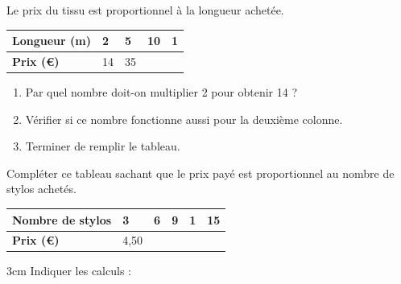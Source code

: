\documentclass[a4paper]{book}
\begin{document}
    \begin{exercice}
        Le prix du tissu est proportionnel à la longueur achetée.

        \begin{center}
            \renewcommand{\arraystretch}{1.8}
            \begin{tabularx}{0.8\textwidth}{|l|X|X|X|X|}
            \hline
            \textbf{Longueur (m)} & 2 & 5 & 10 & 1 \\ \hline
            \textbf{Prix (€)} & 14 & 35 & & \\ \hline
            \end{tabularx}
        \end{center}
        
        \begin{enumerate}
            \item Par quel nombre doit-on multiplier 2 pour obtenir 14 ? \dotfill

            \smallskip
            
            \item Vérifier si ce nombre fonctionne aussi pour la deuxième colonne. \dotfill

            \smallskip
            
            \item Terminer de remplir le tableau. 
        \end{enumerate}
    \end{exercice}


    \begin{exercice}
        Compléter ce tableau sachant que le prix payé est proportionnel au nombre de stylos achetés.

        \vspace{1cm}
        
        \begin{center}
            \renewcommand{\arraystretch}{1.5}
            \begin{tabularx}{\textwidth}{|l|X|X|X|X|X|}
            \hline
            \textbf{Nombre de stylos} & 3 & 6 & 9 & 1 & 15 \\ \hline
            \textbf{Prix (€)} & 4,50 & & & & \\ \hline
            \end{tabularx}
        \end{center}

        \vspace{1cm}

        \begin{ZoneReponse}{3cm}
            Indiquer les calculs : 
        \end{ZoneReponse}
    \end{exercice}  
\end{document}
